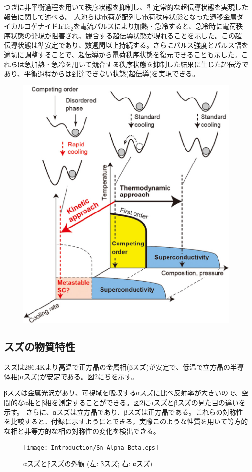 つぎに非平衡過程を用いて秩序状態を抑制し、準定常的な超伝導状態を実現した報告に関して述べる。
大池らは電荷が配列し電荷秩序状態となった遷移金属ダイカルコゲナイドIrTe$_2$を電流パルスにより加熱・急冷すると、急冷時に電荷秩序状態の発現が阻害され、競合する超伝導状態が現れることを示した\cite{Oike}。この超伝導状態は準安定であり、数週間以上持続する。さらにパルス強度とパルス幅を適切に調整することで、超伝導から電荷秩序状態を復元できることも示した。これらは急加熱・急冷を用いて競合する秩序状態を抑制した結果に生じた超伝導であり、平衡過程からは到達できない状態(超伝導)を実現できる。
\begin{figure}[!h]
    \begin{center}
   \includegraphics[width=0.6\hsize]{Introduction/kinetic_approach.eps}
  \end{center}
  \caption{}
  \label{fig:phase_diagram2}
\end{figure}


\subsection{スズの物質特性}
スズは286.4Kより高温で正方晶の金属相(βスズ)が安定で、低温で立方晶の半導体相(αスズ)が安定である。図\ref{fig:Sn-Alpha-Beta}にちを示す。


βスズは金属光沢があり、可視域を吸収するαスズに比べ反射率が大きいので、空間的なα相とβ相を測定することができる。図\ref{fig:Sn-Alpha-Beta}にαスズとβスズの見た目の違いを示す\cite{wiki}。
さらに、αスズは立方晶であり、βスズは正方晶である。これらの対称性を比較すると、付録に示すようにとできる。実際このような性質を用いて等方的な相と非等方的な相の対称性の変化を検出できる\cite{Matvienko}。
\begin{figure}[!h]
    \begin{center}
   \texttt{[image: Introduction/Sn-Alpha-Beta.eps]}
  \end{center}
  \caption{αスズとβスズの外観 (左: βスズ; 右: αスズ)}
  \label{fig:Sn-Alpha-Beta}
\end{figure}

